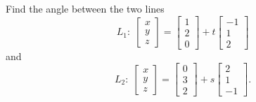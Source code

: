 \documentclass{ximera}
\begin{document}
\begin{example}\label{ex:angle-between-two-lines}

  Find the angle between the two lines%
  \begin{equation*}
    L_1:  \;
    \begin{bmatrix} x \\ y \\ z \end{bmatrix}
    = \begin{bmatrix} 1 \\ 2 \\ 0 \end{bmatrix}
    + t \begin{bmatrix} -1 \\ 1 \\ 2 \end{bmatrix}
  \end{equation*}
  and
  \begin{equation*}
    L_2: \;
    \begin{bmatrix} x \\ y \\ z \end{bmatrix}
    = \begin{bmatrix} 0 \\ 3 \\ 2 \end{bmatrix}
    + s \begin{bmatrix} 2 \\ 1 \\ -1 \end{bmatrix}.
  \end{equation*}
\end{example}
\end{document}
